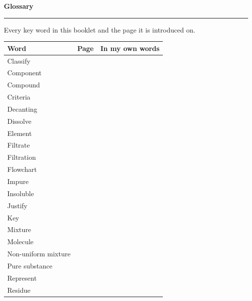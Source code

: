 \documentclass[11pt,a5paper,twoside]{article}
\begin{document}
\newpage
\clearpage{}\hypertarget{glossary}{}
{\headingfont\bfseries\LARGE Glossary}\label{sec:glossary}\par\vspace{1mm}\noindent\rule{\linewidth}{0.6pt}\par
{\small Every key word in this booklet and the page it is introduced on.}\par\smallskip
\renewcommand{\arraystretch}{1.3}
\begin{longtable}{|>{\RaggedRight}p{34mm}|p{9mm}|p{\dimexpr\linewidth-43mm-6\tabcolsep-4\arrayrulewidth-1pt\relax}|}
\hline \rule{0pt}{4mm}\headingfont\bfseries Word & \headingfont\bfseries Page & \headingfont\bfseries In my own words \\ \hline \endhead
  Classify & \pageref{voc:classify} & \\ \hline
  Component & \pageref{voc:component} & \\ \hline
  Compound & \pageref{voc:compound} & \\ \hline
  Criteria & \pageref{voc:criteria} & \\ \hline
  Decanting & \pageref{voc:decanting} & \\ \hline
  Dissolve & \pageref{voc:dissolve} & \\ \hline
  Element & \pageref{voc:element} & \\ \hline
  Filtrate & \pageref{voc:filtrate} & \\ \hline
  Filtration & \pageref{voc:filtration} & \\ \hline
  Flowchart & \pageref{voc:flowchart} & \\ \hline
  Impure & \pageref{voc:impure} & \\ \hline
  Insoluble & \pageref{voc:insoluble} & \\ \hline
  Justify & \pageref{voc:justify} & \\ \hline
  Key & \pageref{voc:key} & \\ \hline
  Mixture & \pageref{voc:mixture} & \\ \hline
  Molecule & \pageref{voc:molecule} & \\ \hline
  Non-uniform mixture & \pageref{voc:non-uniform-mixture} & \\ \hline
  Pure substance & \pageref{voc:pure-substance} & \\ \hline
  Represent & \pageref{voc:represent} & \\ \hline
  Residue & \pageref{voc:residue} & \\ \hline

\end{longtable}
\end{document}
